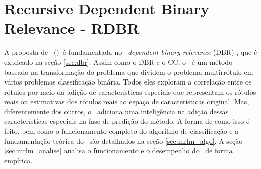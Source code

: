 

\chapter{Recursive Dependent Binary Relevance - RDBR}
A proposta de \MRLM~(\MRLMa)~é fundamentada no \MML~\textit{dependent binary relevance} (DBR) \cite{dbr2014}, que é explicado
na seção \ref{sec:dbr}. Assim como o DBR e o CC, o \MRLMa~é um método baseado na transformação do problema que dividem o problema
multirrótulo em vários problemas classificação binária. Todos eles exploram a correlação entre os rótulos por meio da adição de
características especiais que representam os rótulos reais ou estimativas dos rótulos reais ao espaço de características original. 
Mas, diferentemente dos outros, o \MRLMa~adiciona uma inteligência na adição dessas características especiais na fase de predição do método.
A forma de como isso é feito, bem como o funcionamento completo do algoritmo de classificação e a fundamentação teórica
do \MRLMa~são detalhados na seção \ref{sec:mrlm_algo}. 
A seção \ref{sec:mrlm_analise} analisa o funcionamento e o desempenho do \MRLMa~de forma empírica.


